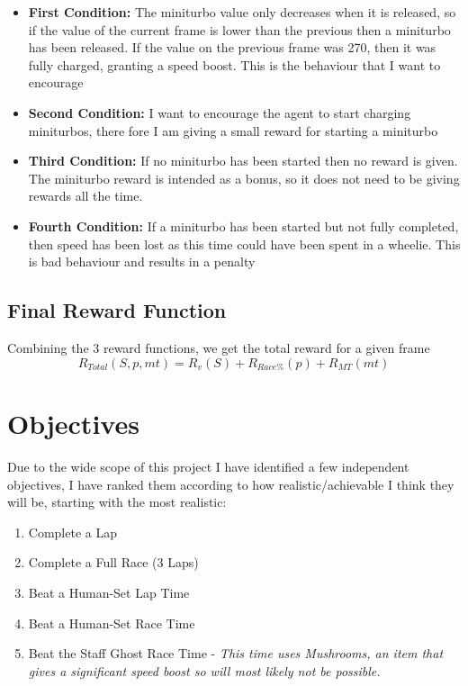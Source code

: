 \documentclass{article}
\begin{document}
\begin{itemize}
    \item \textbf{First Condition:}
    The miniturbo value only decreases when it is released, so if the value of the current frame is lower than the previous then a miniturbo has been released. If the value on the previous frame was 270, then it was fully charged, granting a speed boost. This is the behaviour that I want to encourage
    \item \textbf{Second Condition:}
    I want to encourage the agent to start charging miniturbos, there fore I am giving a small reward for starting a miniturbo
    \item \textbf{Third Condition:} 
    If no miniturbo has been started then no reward is given. The miniturbo reward is intended as a bonus, so it does not need to be giving rewards all the time.
    \item \textbf{Fourth Condition:} 
    If a miniturbo has been started but not fully completed, then speed has been lost as this time could have been spent in a wheelie. This is bad behaviour and results in a penalty
\end{itemize}

\subsection{Final Reward Function}
Combining the 3 reward functions, we get the total reward for a given frame
\[
R_{Total}(S,p,mt) = R_{v}(S) + R_{Race\%}(p) + R_{MT}(mt)
\]

\section{Objectives}
Due to the wide scope of this project I have identified a few independent objectives, I have ranked them according to how realistic/achievable I think they will be, starting with the most realistic:
\begin{enumerate}
    \item Complete a Lap
    \item Complete a Full Race (3 Laps)
    \item Beat a Human-Set Lap Time
    \item Beat a Human-Set Race Time
    \item Beat the Staff Ghost Race Time - \textit{This time uses Mushrooms, an item that gives a significant speed boost so will most likely not be possible.}
\end{enumerate}
\end{document}
